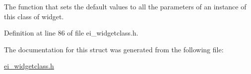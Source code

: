 The function that sets the default values to all the parameters of an instance of this class of widget. 



Definition at line 86 of file ei\+\_\+widgetclass.\+h.



The documentation for this struct was generated from the following file\+:\begin{DoxyCompactItemize}
\item 
\hyperlink{ei__widgetclass_8h}{ei\+\_\+widgetclass.\+h}\end{DoxyCompactItemize}
